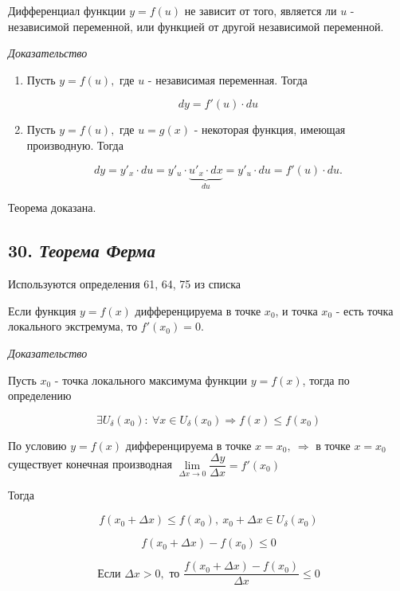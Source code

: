 Дифференциал функции $y = f(u)$ не зависит от того, является ли $u$ - независимой переменной, или функцией от другой независимой переменной.
\vspace*{20pt} 

\textit{Доказательство}
\begin{enumerate}

\item Пусть $y = f(u),$ где $u$ - независимая переменная. Тогда

$$dy = f'(u)\cdot du
    $$
\item Пусть $y = f(u),$ где $u = g(x)$ - некоторая функция, имеющая производную. Тогда

$$dy = y'_x\cdot du = y'_u\cdot \underbrace{u'_x \cdot dx}_{du} = y'_u\cdot du = f'(u) \cdot du.
    $$

\end{enumerate}

Теорема доказана.
\newpage 
\subsection*{30. \textit{Теорема Ферма}}
\begin{Quote2} 
\small\centering 

Используются определения 61, 64, 75 из списка \end{Quote2} 

Если функция $y = f(x)$ дифференцируема в точке $x_0$, и точка $x_0$ - есть точка локального экстремума, то $f'(x_0) = 0$.
\vspace*{20pt} 

\textit{Доказательство}

Пусть $x_0$ - точка локального максимума функции $y = f(x)$, тогда по определению

$$
\exists U_\delta(x_0) : \ \forall x \in U_\delta(x_0) \Rightarrow f(x) \leqslant f(x_0)
$$

По условию $y = f(x)$ дифференцируема в точке $x = x_0, \ \Rightarrow$ в точке $x = x_0$ существует конечная производная $\lim\limits_{\Delta x \rightarrow 0}{\dfrac{\Delta y}{\Delta x}} = f'(x_0)$

Тогда

$$
f(x_0 + \Delta x) \leqslant f(x_0), \ x_0 + \Delta x \in U_\delta(x_0)
$$

$$
f(x_0 + \Delta x) - f(x_0) \leqslant 0
$$

$$
\text{Если } \Delta x > 0, \text{ то } {\dfrac{f(x_0+\Delta x) - f(x_0)}{\Delta x}} \leqslant 0
$$

